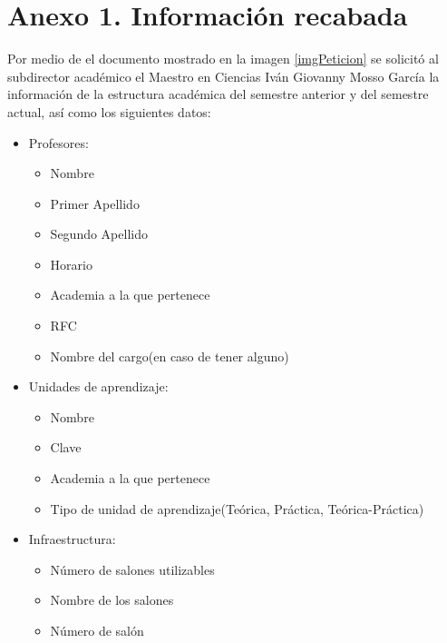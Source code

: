 \label{sec:Anexos}

\section{Anexo 1. Información recabada}

Por medio de el documento mostrado en la imagen \ref{imgPeticion} se solicitó al subdirector académico el Maestro en Ciencias Iván Giovanny Mosso García la información de la estructura académica del semestre anterior y del semestre actual, así como los siguientes datos:

\begin{itemize}
	\item Profesores:
		\begin{itemize}
			\item Nombre
			\item Primer Apellido
			\item Segundo Apellido
			\item Horario
			\item Academia a la que pertenece
			\item RFC
			\item Nombre del cargo(en caso de tener alguno)
		\end{itemize}	
	\item Unidades de aprendizaje:
		\begin{itemize}
			\item Nombre
			\item Clave
			\item Academia a la que pertenece
			\item Tipo de unidad de aprendizaje(Teórica, Práctica, Teórica-Práctica)
		\end{itemize}
	\item Infraestructura:
		\begin{itemize}
			\item Número de salones utilizables
			\item Nombre de los salones
			\item Número de salón
		\end{itemize}
\end{itemize}

